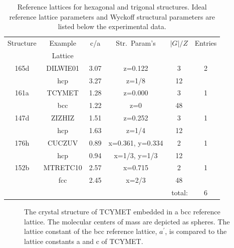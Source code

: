 \documentclass[preprint]{revtex4}              %
\begin{document}
\begin{table}
\caption[Reference lattices for hexagonal and trigonal
structures.]{Reference lattices for hexagonal and trigonal
structures. Ideal reference lattice parameters and Wyckoff
structural parameters are listed below the experimental data.}
\label{hex}
\begin{center}
\begin{tabular}{cccccc}%
\cline{1-6}
Structure & Example & c/a & Str.\ Param's & $|G|/Z$ & Entries \\
          & Lattice \\
\cline{1-6}
165d    & DILWIE01  & 3.07  & z=0.122          &  3 & 2 \\
        & hcp       & 3.27  & z=1/8            & 12 \\
161a    & TCYMET    & 1.28  & z=0.000          &  3 & 1 \\
        & bcc       & 1.22  & z=0              & 48 \\
147d    & ZIZHIZ    & 1.51  & z=0.252          &  3 & 1 \\
        & hcp       & 1.63  & z=1/4            & 12 \\
176h    & CUCZUV    & 0.89  & x=0.361, y=0.334 &  2 & 1 \\
        & hcp       & 0.94  & x=1/3, y=1/3     & 12 \\
152b    & MTRETC10  & 2.57  & x=0.715          &  2 & 1 \\
        & fcc       & 2.45  & x=2/3            & 48 \\
\cline{6-6}
\multicolumn{5}{r}{total:} & 6 \\
 \cline{1-6}
\end{tabular}
\end{center}
\end{table}

\begin{figure}
\begin{center}
 \caption[The
crystal structure of TCYMET embedded in a bcc reference
lattice.]{The crystal structure of TCYMET embedded in a bcc
reference lattice. The molecular centers of mass are depicted as
spheres. The lattice constant of the bcc reference lattice,
$a^\prime$, is compared to the lattice constants a and c of
TCYMET.\label{bccEmbed}}
\end{center}
\end{figure}
\end{document}
